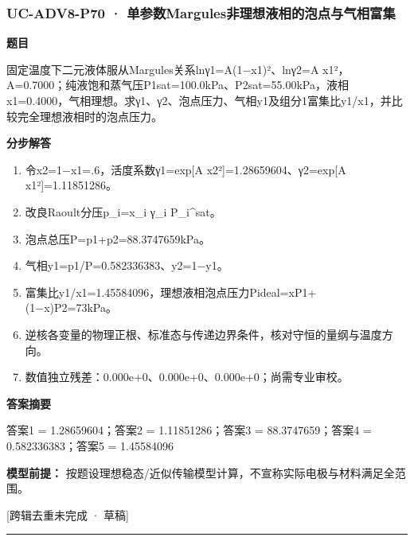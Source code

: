 \documentclass[UTF8,11pt,a4paper]{ctexart}
\begin{document}
\subsubsection*{UC-ADV8-P70 · 单参数Margules非理想液相的泡点与气相富集}
\noindent\textbf{题目}\par
固定温度下二元液体服从Margules关系lnγ1=A(1−x1)²、lnγ2=A x1²，A=0.7000；纯液饱和蒸气压P1sat=100.0kPa、P2sat=55.00kPa，液相x1=0.4000，气相理想。求γ1、γ2、泡点压力、气相y1及组分1富集比y1/x1，并比较完全理想液相时的泡点压力。\par
\medskip\noindent\textbf{分步解答}
\begin{enumerate}
\item 令x2=1−x1=.6，活度系数γ1=exp[A x2²]=1.28659604、γ2=exp[A x1²]=1.11851286。
\item 改良Raoult分压p\_i=x\_i γ\_i P\_i\textasciicircum{}sat。
\item 泡点总压P=p1+p2=88.3747659kPa。
\item 气相y1=p1/P=0.582336383、y2=1−y1。
\item 富集比y1/x1=1.45584096，理想液相泡点压力Pideal=xP1+(1−x)P2=73kPa。
\item 逆核各变量的物理正根、标准态与传递边界条件，核对守恒的量纲与温度方向。
\item 数值独立残差：0.000e+0、0.000e+0、0.000e+0；尚需专业审校。
\end{enumerate}
\noindent\textbf{答案摘要}\par
答案1 = 1.28659604；答案2 = 1.11851286；答案3 = 88.3747659；答案4 = 0.582336383；答案5 = 1.45584096\par
\noindent\textbf{模型前提：}
按题设理想稳态/近似传输模型计算，不宣称实际电极与材料满足全范围。\par
\noindent\textcolor{red!65!black}{[跨辑去重未完成 · 草稿]} \par
\medskip\hrule\medskip
{}
\end{document}
